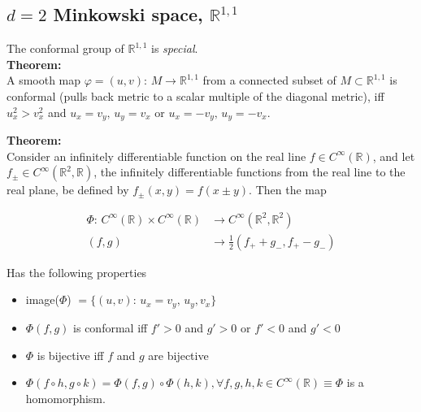 \documentclass[10pt]{article}
\begin{document}
\subsection*{$d=2$ Minkowski space, $\mathbb{R}^{1,1}$}

\noindent The conformal group  of $\mathbb{R}^{1,1}$ is \textit{special}. \\

\noindent \textbf{Theorem:} \\

\noindent A smooth map $\varphi = (u,v) : \, M \rightarrow \mathbb{R}^{1,1}$ from a connected subset of $M \subset \mathbb{R}^{1,1}$ is conformal (pulls back metric to a scalar multiple of the diagonal metric), iff $u_x^2 > v_x^2$ and $u_x = v_y,\, u_y = v_x$ or $u_x = -v_y,\, u_y = -v_x$. \\

\begin{figure}[H]
	\centering
\end{figure} 

\noindent \textbf{Theorem:} \\

\noindent Consider an infinitely differentiable function on the real line $f \in C^\infty (\mathbb{R})$, and let $f_\pm \in C^\infty (\mathbb{R}^2, \mathbb{R})$, the infinitely differentiable functions from the real line to the real plane, be defined by $f_\pm (x,y) = f(x \pm y)$. Then the map 

\begin{align}
\Phi: \, C^\infty (\mathbb{R}) \times C^\infty (\mathbb{R}) &\rightarrow C^\infty (\mathbb{R}^2, \mathbb{R}^2) \\
(f,g) &\rightarrow \frac{1}{2} (f_+ + g_-, f_+ - g_- )
\end{align}

\noindent Has the following properties

\begin{itemize}
\item image($\Phi$) $= \{ (u,v): \, u_x = v_y, \, u_y, v_x \}$
\item $\Phi(f,g)$ is conformal iff $f'>0$ and $g' >0$ or $f'<0$ and $g'<0$
\item $\Phi$ is bijective iff $f$ and $g$ are bijective
\item $\Phi(f \circ h, g \circ k) = \Phi(f,g) \circ \Phi (h,k), \forall f,g,h,k \in C^\infty(\mathbb{R}) \equiv \Phi$ is a homomorphism.
\end{itemize}
\end{document}

